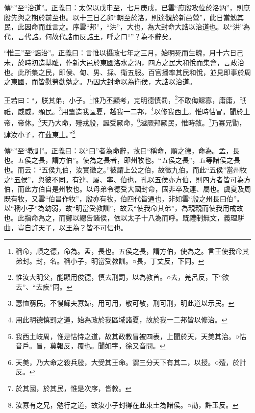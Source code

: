 {\noindent\zhuan{}\fzbyks 傳“”至“治道”。正義曰：太保以戊申至，七月庚戌，已雲“庶殷攻位於洛汭”，則庶殷先與之期於前至也。以十三日乙卯“朝至於洛，則達觀於新邑營”，此日當勉其民，此因命而並言之。序雲“邦”，“洪”，大也，為大封命大誥以治道也。以“洪”為代，言代誥。何故代誥而反誥王，呼之曰“”？為不辭矣。 \par}

{\noindent\shu{}\fzkt “惟三”至“誥治”。正義曰：言惟以攝政七年之三月，始明死而生魄，月十六日己未，於時初造基趾，作新大邑於東國洛水之汭，四方之民大和悅而集會，言政治也。此所集之民，即侯、甸、男、採、衛五服。百官播率其民和悅，並見即事於周之東國，而皆慰勞勸勉之。乃因大封命以為衛侯，大誥以治道。 \par}

王若曰：“，朕其弟，小子。\footnote{稱命，順之德，命為。孟，長也。五侯之長，謂方伯，使為之。言王使我命其弟封。封，名。稱小子，明當受教訓。○長，丁丈反，下同。}惟乃丕顯考，克明德慎罰，\footnote{惟汝大明父，能顯用俊德，慎去刑罰，以為教首。○去，羌呂反，下“欲去”、“去疾”同。}不敢侮鰥寡，庸庸，祇祇，威威，顯民。\footnote{惠恤窮民，不慢鰥夫寡婦，用可用，敬可敬，刑可刑，明此道以示民。}用肇造我區夏，越我一二邦，\footnote{用此明德慎罰之道，始為政於我區域諸夏，故於我一二邦皆以修治。}以修我西土。惟時怙冒，聞於上帝，帝休。\footnote{我西土岐周，惟是怙恃之道，故其政教冒被四表，上聞於天，天美其治。○怙音戶。冒，莫報反，覆也。聞如字，徐又音問。}天乃大命，殪戎殷，誕受厥命，\footnote{天美，乃大命之殺兵殷，大受其王命。謂三分天下有其二，以授。○殪，於計反。}越厥邦厥民，惟時敘。\footnote{於其國，於其民，惟是次序，皆教。}乃寡兄勖，肆汝小子，在茲東土。”\footnote{汝寡有之兄，勉行之道，故汝小子封得在此東土為諸侯。○勖，許玉反。}


{\noindent\zhuan{}\fzbyks 傳“”至“教訓”。正義曰：以“曰”者為命辭，故曰“稱命，順之德，命為。孟，長也。五侯之長，謂方伯”。使為之長者，即州牧也。“五侯之長”，五等諸侯之長也。而云：“五侯九伯，汝實徵之。”彼謂上公之伯，故徵九伯。而此“五侯”當州牧之“五侯”，與彼不同。有連、屬、率、伯也，孔以五侯亦方伯，則四方者皆可為方伯，而此方伯自是州牧也。以母弟令德受大國封命，固非卒及連、屬也。虞夏及周既有牧，又雲“伯昌作牧”，殷亦有牧，伯四代皆通也，非如雲“殷之州長曰伯”。以“稱小子”為幼弱，故“明當受教訓”，故云“使我命其弟”，為親親而使我用戒故也。此指命為之，而鄭以總告諸侯，依以太子十八為而呼。既禮制無文，義理駢曲，豈自許天子，以王為？皆不可信也。 \par}

